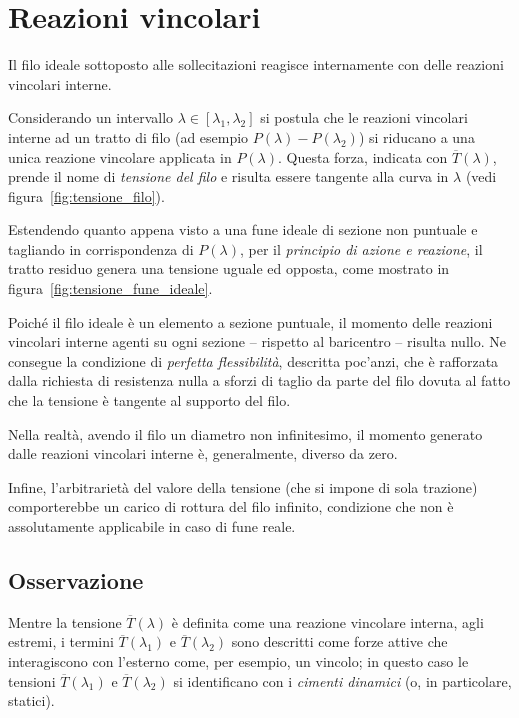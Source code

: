 \section*{Reazioni vincolari}
Il filo ideale sottoposto alle sollecitazioni reagisce internamente con delle reazioni vincolari interne.

Considerando un intervallo $\lambda\in[\lambda_1, \lambda_2]$ si postula che le reazioni vincolari interne ad un tratto di filo (ad esempio $P(\lambda) - P(\lambda_2)$) si riducano a una unica reazione vincolare applicata in $P(\lambda)$. Questa forza, indicata con $\overline{T}(\lambda)$, prende il nome di \emph{tensione del filo} e risulta essere tangente alla curva in $\lambda$ (vedi figura~\ref{fig:tensione_filo}).



Estendendo quanto appena visto a una fune ideale di sezione non puntuale e tagliando in corrispondenza di $P(\lambda)$, per il \emph{principio di azione e reazione}, il tratto residuo genera una tensione uguale ed opposta, come mostrato in figura~\ref{fig:tensione_fune_ideale}.

Poiché il filo ideale è un elemento a sezione puntuale, il momento delle reazioni vincolari interne agenti su ogni sezione -- rispetto al baricentro -- risulta nullo. Ne consegue la condizione di \emph{perfetta flessibilità}, descritta poc'anzi, che è rafforzata dalla richiesta di  resistenza nulla a sforzi di taglio da parte del filo dovuta al fatto che la tensione è tangente al supporto del filo.

Nella realtà, avendo il filo un diametro non infinitesimo, il momento generato dalle reazioni vincolari interne è, generalmente, diverso da zero.

Infine, l'arbitrarietà del valore della tensione (che si impone di sola trazione) comporterebbe un carico di rottura del filo infinito, condizione che non è assolutamente applicabile in caso di fune reale.

\subsection*{Osservazione}
Mentre la tensione $\overline{T}(\lambda)$ è definita come una reazione vincolare interna, agli estremi, i termini $\overline{T}(\lambda_1)$ e $\overline{T}(\lambda_2)$ sono descritti come forze attive che interagiscono con l'esterno come, per esempio, un vincolo; in questo caso le tensioni $\overline{T}(\lambda_1)$ e $\overline{T}(\lambda_2)$ si identificano con i \emph{cimenti dinamici} (o, in particolare, statici).

